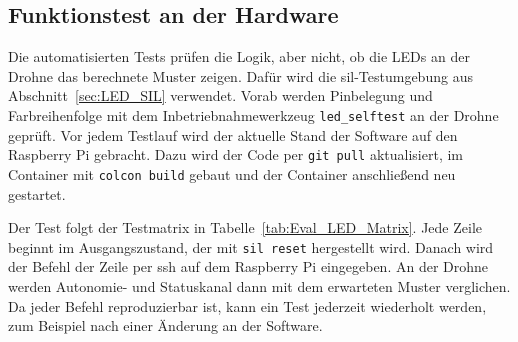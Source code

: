         \subsection{Funktionstest an der Hardware}
        \label{sec:Eval_LED_SIL}

        Die automatisierten Tests prüfen die Logik, aber nicht, ob die LEDs an der Drohne das berechnete Muster zeigen. Dafür wird die \gls{sil}-Testumgebung aus Abschnitt~\ref{sec:LED_SIL} verwendet. Vorab werden Pinbelegung und Farbreihenfolge mit dem Inbetriebnahmewerkzeug \texttt{led\_selftest} an der Drohne geprüft. Vor jedem Testlauf wird der aktuelle Stand der Software auf den Raspberry Pi gebracht. Dazu wird der Code per \texttt{git pull} aktualisiert, im Container mit \texttt{colcon build} gebaut und der Container anschließend neu gestartet.

        Der Test folgt der Testmatrix in Tabelle~\ref{tab:Eval_LED_Matrix}. Jede Zeile beginnt im Ausgangszustand, der mit \texttt{sil reset} hergestellt wird. Danach wird der Befehl der Zeile per \gls{ssh} auf dem Raspberry Pi eingegeben. An der Drohne werden Autonomie- und Statuskanal dann mit dem erwarteten Muster verglichen. Da jeder Befehl reproduzierbar ist, kann ein Test jederzeit wiederholt werden, zum Beispiel nach einer Änderung an der Software.

